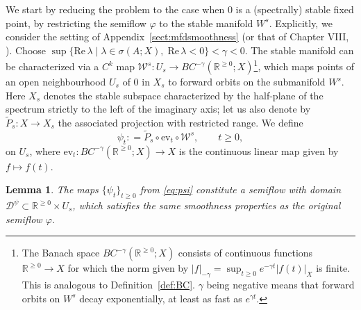 \documentclass[a4paper, 12pt, oneside, reqno, notitlepage]{amsart}
\theoremstyle{plain}
\newtheorem{lemma}[theorem]{Lemma}
\theoremstyle{definition}
\theoremstyle{remark}
\begin{document}
We start by reducing the problem to the case when $0$ is a (spectrally) stable fixed point, by restricting the semiflow $\varphi$ to the stable manifold $W^s$.
Explicitly, we consider the setting of Appendix~\ref{sect:mfdsmoothness} (or that of Chapter VIII, \cite{diekmann2012delay}).
Choose $\sup\{ \mathrm{Re} \, \lambda \; | \; \lambda \in \sigma(A;X), \; \mathrm{Re} \, \lambda < 0 \}< \gamma < 0$.
The stable manifold can be characterized via a $C^k$ map $\mathcal{W}^s : U_s \to BC^{-\gamma}(\mathbb{R}^{\geq 0};X)$\footnote{The Banach space $BC^{-\gamma}(\mathbb{R}^{\geq 0};X)$ consists of continuous functions $\mathbb{R}^{\geq 0} \to X$ for which the norm  given by $|f|_{-\gamma}=\sup_{t \geq 0} e^{-\gamma t}|f(t)|_X$ is finite.
This is analogous to Definition~\ref{def:BC}.
$\gamma$ being negative means that forward orbits on $W^s$ decay exponentially, at least as fast as $e^{\gamma t}$.
},
which maps points of an open neighbourhood $U_s$ of $0$ in $X_s$ to forward orbits on the submanifold $W^s$.
Here $X_s$ denotes the stable subspace characterized by the half-plane  of the spectrum strictly to the left of the imaginary axis; let us also denote by $\widetilde{P}_s:X \to X_s$ the associated projection with restricted range.
We define
\begin{equation}
    \psi_t : = \widetilde{P}_s \circ \mathrm{ev}_t \circ \mathcal{W}^s, \qquad t \geq 0,
    \label{eq:psi}
\end{equation}
on $U_s$,
where $\mathrm{ev}_t: BC^{-\gamma}(\mathbb{R}^{\geq 0};X) \to X$ is the continuous linear map given by $f \mapsto f(t)$.


\begin{lemma} \label{lemma:psi}
    The maps $\{\psi_t\}_{t \geq 0}$ from \eqref{eq:psi} constitute a semiflow  with domain $\mathcal{D}^\psi \subset\mathbb{R}^{\geq 0} \times U_s$, which satisfies the same smoothness properties as the original semiflow $\varphi$.
\end{lemma}
\end{document}
